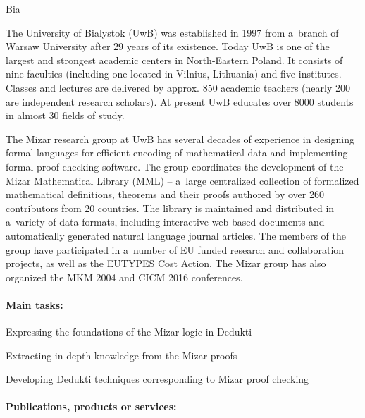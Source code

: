 \begin{sitedescription}{Bia}



The University of Bialystok (UwB) was established in 1997 from a~branch of Warsaw University after 29 years of its existence.
Today UwB is one of the largest and strongest academic centers in North-Eastern Poland.
It consists of nine faculties (including one located in Vilnius, Lithuania) and five institutes.
Classes and lectures are delivered by approx. 850 academic teachers (nearly 200 are independent research scholars).
At present UwB educates over 8000 students in almost 30 fields of study.

The Mizar research group at UwB has several decades of experience in designing formal languages 
for efficient encoding of mathematical data and implementing formal proof-checking software.
The group coordinates the development of the Mizar Mathematical Library (MML) -- 
a~large centralized collection of formalized mathematical definitions, theorems and their proofs 
authored by over 260 contributors from 20 countries.
The library is maintained and distributed in a~variety of data formats, 
including interactive web-based documents and automatically generated natural language journal articles. 
The members of the group have participated in a~number of EU funded research
and collaboration projects,
as well as the EUTYPES Cost Action.
The Mizar group has also organized the MKM 2004 and CICM 2016 conferences.

\paragraph{Main tasks:}

\begin{compactitem}
\item Expressing the foundations of the Mizar logic in Dedukti 
\item Extracting in-depth knowledge from the Mizar proofs 
\item Developing Dedukti techniques corresponding to Mizar proof checking 
\end{compactitem}

\paragraph{Publications, products or services:}


\end{sitedescription}

